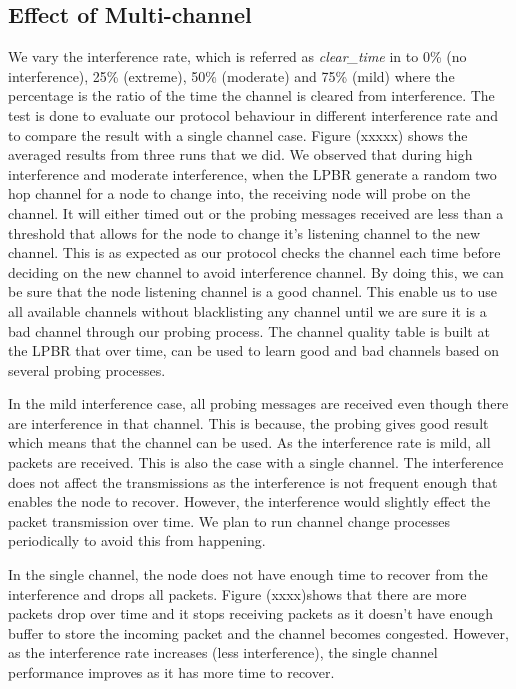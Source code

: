 \subsection{Effect of Multi-channel}

We vary the interference rate, which is referred as \textit{clear\_time} in \cite{Boano:2010:MSM:2127940.2127963} to 0\% (no interference), 25\% (extreme), 50\% (moderate) and 75\% (mild) where the percentage is the ratio of the time the channel is cleared from interference. The test is done to evaluate our protocol behaviour in different interference rate and to compare the result with a single channel case. Figure (xxxxx) shows the averaged results from three runs that we did. We observed that during high interference and moderate interference, when the LPBR generate a random two hop channel for a node to change into, the receiving node will probe on the channel. It will either timed out or the probing messages received are less than a threshold that allows for the node to change it's listening channel to the new channel. This is as expected as our protocol checks the channel each time before deciding on the new channel to avoid interference channel. By doing this, we can be sure that the node listening channel is a good channel. This enable us to use all available channels without blacklisting any channel until we are sure it is a bad channel through our probing process. The channel quality table is built at the LPBR that over time, can be used to learn good and bad channels based on several probing processes. 

In the mild interference case, all probing messages are received even though there are interference in that channel. This is because, the probing gives good result which means that the channel can be used. As the interference rate is mild, all packets are received. This is also the case with a single channel. The interference does not affect the transmissions as the interference is not frequent enough that enables the node to recover. However, the interference would slightly effect the packet transmission over time. We plan to run channel change processes periodically to avoid this from happening. %

In the single channel, the node does not have enough time to recover from the interference and drops all packets. Figure (xxxx)shows that there are more packets drop over time and it stops receiving packets as it doesn't have enough buffer to store the incoming packet and the channel becomes congested. However, as the interference rate increases (less interference), the single channel performance improves as it has more time to recover.

